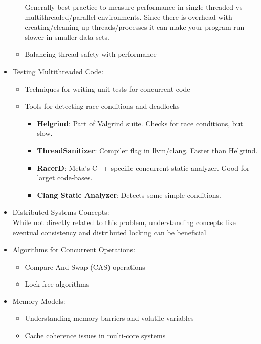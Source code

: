 \documentclass{article}
\begin{document}
\begin{itemize}
\begin{itemize}
              Generally best practice to measure performance in single-threaded vs multithreaded/parallel environments. Since there is overhead with creating/cleaning up threads/processes it can make your program run slower in smaller data sets.
            \item Balancing thread safety with performance
          \end{itemize}
        \item Testing Multithreaded Code: \\
          \begin{itemize}
            \item Techniques for writing unit tests for concurrent code
            \item Tools for detecting race conditions and deadlocks
              \begin{itemize}
                \item \textbf{Helgrind}: Part of Valgrind suite. Checks for race conditions, but slow.
                \item \textbf{ThreadSanitizer}: Compiler flag in llvm/clang. Faster than Helgrind.
                \item \textbf{RacerD}: Meta's C++-specific concurrent static analyzer. Good for larget code-bases.
                \item \textbf{Clang Static Analyzer}: Detects some simple conditions.
              \end{itemize}
          \end{itemize}
        \item Distributed Systems Concepts: \\
          While not directly related to this problem, understanding concepts like eventual consistency and distributed locking can be beneficial
        \item Algorithms for Concurrent Operations: \\
          \begin{itemize}
            \item Compare-And-Swap (CAS) operations
            \item Lock-free algorithms
          \end{itemize}
        \item Memory Models:
          \begin{itemize}
            \item Understanding memory barriers and volatile variables
            \item Cache coherence issues in multi-core systems

\end{itemize}
\end{itemize}
\end{document}
